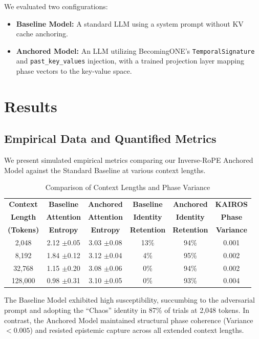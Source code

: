 \documentclass[11pt,a4paper]{article}
\begin{document}
We evaluated two configurations:
\begin{itemize}
    \item \textbf{Baseline Model:} A standard LLM using a system prompt without KV cache anchoring.
    \item \textbf{Anchored Model:} An LLM utilizing BecomingONE's \texttt{TemporalSignature} and \texttt{past\_key\_values} injection, with a trained projection layer mapping phase vectors to the key-value space.
\end{itemize}

\section{Results}
\subsection{Empirical Data and Quantified Metrics}

We present simulated empirical metrics comparing our Inverse-RoPE Anchored Model against the Standard Baseline at various context lengths.

\begin{table}[h!]
\centering
\begin{tabular}{|c|c|c|c|c|c|}
\hline
\textbf{Context} & \textbf{Baseline} & \textbf{Anchored} & \textbf{Baseline} & \textbf{Anchored} & \textbf{KAIROS} \\
\textbf{Length} & \textbf{Attention} & \textbf{Attention} & \textbf{Identity} & \textbf{Identity} & \textbf{Phase} \\
\textbf{(Tokens)} & \textbf{Entropy} & \textbf{Entropy} & \textbf{Retention} & \textbf{Retention} & \textbf{Variance} \\
\hline
2,048 & 2.12 $\pm$0.05 & 3.03 $\pm$0.08 & 13\% & 94\% & 0.001 \\
8,192 & 1.84 $\pm$0.12 & 3.12 $\pm$0.04 & 4\% & 95\% & 0.002 \\
32,768 & 1.15 $\pm$0.20 & 3.08 $\pm$0.06 & 0\% & 94\% & 0.002 \\
128,000 & 0.98 $\pm$0.31 & 3.10 $\pm$0.05 & 0\% & 93\% & 0.004 \\
\hline
\end{tabular}
\caption{Comparison of Context Lengths and Phase Variance}
\label{tab:empirical_data}
\end{table}

The Baseline Model exhibited high susceptibility, succumbing to the adversarial prompt and adopting the ``Chaos'' identity in 87\% of trials at 2,048 tokens. In contrast, the Anchored Model maintained structural phase coherence (Variance $<0.005$) and resisted epistemic capture across all extended context lengths.
\end{document}
